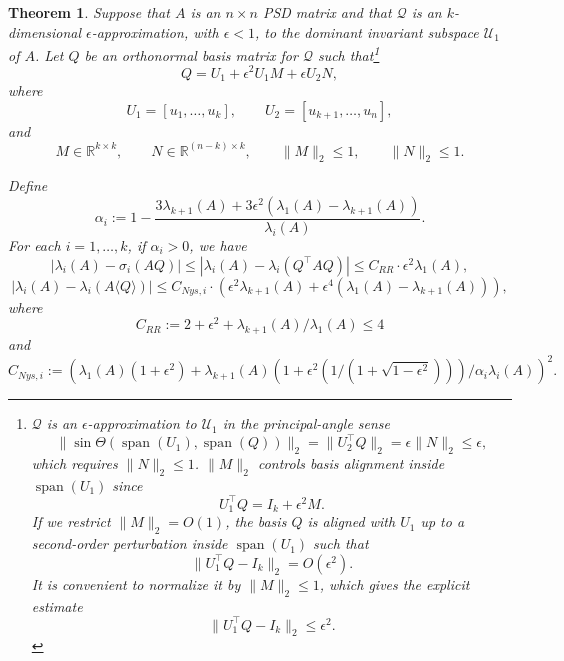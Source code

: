 \documentclass[10pt,a4paper]{amsart}
\newtheorem{theorem}{Theorem}
\newcommand{\image}{\operatorname{span}}
\def\leadingsubspace{\mathcal{U}_1}
\def\realR{\mathbb{R}}
\def\subspace{\mathcal{Q}}
\begin{document}
\begin{theorem}
    \label{thm:Higher-order-accuracy-Nystrom-theorem}
    Suppose that $A$ is an $n \times n$ PSD matrix and that $\subspace$ is an $k$-dimensional $\epsilon$-approximation, with $\epsilon < 1$, to the dominant invariant subspace $\leadingsubspace$ of $A$. Let $Q$ be an orthonormal basis matrix for $\subspace$ such that\footnote{$\subspace$ is an $\epsilon$-approximation to $\leadingsubspace$ in the principal-angle sense
    \[
    \|\sin \Theta(\image(U_1), \image(Q))\|_2 = \|U_2^\top Q\|_2 = \epsilon \|N\|_2 \leq \epsilon,
    \]
    which requires $\|N\|_2 \leq 1$. $\|M\|_2$ controls basis alignment inside $\image(U_1)$ since
    \[
    U_1^\top Q = I_k + \epsilon^2 M.
    \]
    If we restrict $\|M\|_2 = O(1)$, the basis $Q$ is aligned with $U_1$ up to a second-order perturbation inside $\image(U_1)$ such that
    \[
    \|U_1^\top Q - I_k\|_2 = O(\epsilon^2).
    \]
    It is convenient to normalize it by $\|M\|_2 \leq 1$, which gives the explicit estimate
    \[
    \|U_1^\top Q - I_k\|_2 \leq \epsilon^2.
    \]
    }
    \begin{equation}
        \label{eq:eps-approximation-Q-formula}
        Q = U_1 + \epsilon^2 U_1 M + \epsilon U_2 N,
    \end{equation}
    where
    \[
        U_1 = [u_1,\ldots,u_k], 
        \qquad
        U_2 = [u_{k+1},\ldots,u_n],
    \]
    and
    \[
        M \in \realR^{k \times k}, 
        \qquad
        N \in \realR^{(n-k) \times k},
        \qquad
        \|M\|_2 \leq 1, 
        \qquad
        \|N\|_2 \leq 1 .
    \]

    Define 
        \[
\alpha_i :=   1-\frac{  3\lambda_{k+1}(A) + 3 \epsilon^2 (\lambda_1(A) - \lambda_{k+1}(A))}{\lambda_i(A)} . 
    \]
    For each $i=1,\ldots, k$, if 
    $\alpha_i>0$, we have
    \begin{equation}
        \label{eq:Upper-bound-RR}
        \left|\lambda_{i}(A) - \sigma_i(AQ)\right| \leq \left|\lambda_{i}(A) - \lambda_i(Q^\top A Q)\right| \leq C_{RR} \cdot \epsilon^2 \lambda_{1}(A),
    \end{equation}
    \begin{equation}
        \label{eq:Upper-bound-Nys}
        \left| \lambda_{i}(A) - \lambda_{i}(A \langle Q \rangle) \right| \leq C_{Nys,i} \cdot \left(\epsilon^2\lambda_{k+1}(A) + \epsilon^4 (\lambda_1(A) - \lambda_{k+1}(A))\right),
    \end{equation}
    where 
    \[
        C_{RR} := 2 + \epsilon^2 + \lambda_{k+1}(A) / \lambda_1(A) \leq 4
    \]
    and
    \[
        C_{Nys, i} := \left(\lambda_1(A) (1+ \epsilon^2) + \lambda_{k+1}(A) \left(1 + \epsilon^2 \left(1 / \left(1 + \sqrt{1-\epsilon^2}\right)\right)\right) / \alpha_{i} \lambda_i(A)\right)^2.
    \]
\end{theorem}
\end{document}
